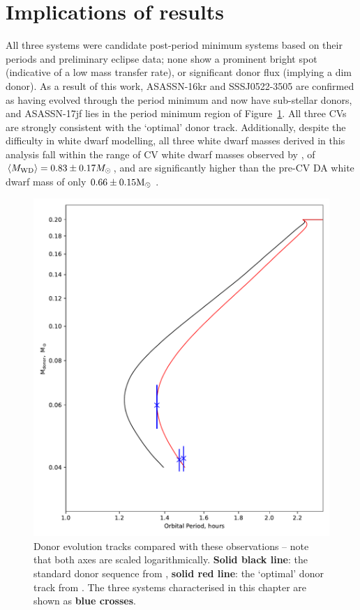 \section{Implications of results}
\label{sect:discussion:three CVs with peculiar white dwarf colours}

All three systems were candidate post-period minimum systems based on their periods and preliminary eclipse data; none show a prominent bright spot (indicative of a low mass transfer rate), or significant donor flux (implying a dim donor).
As a result of this work, ASASSN-16kr and SSSJ0522-3505 are confirmed as having evolved through the period minimum and now have sub-stellar donors, and ASASSN-17jf lies in the period minimum region of Figure~\ref{fig:M2_vs_P}. All three CVs are strongly consistent with the `optimal' \citet{knigge11} donor track.
Additionally, despite the difficulty in white dwarf modelling, all three white dwarf masses derived in this analysis fall within the range of CV white dwarf masses observed by \citet{pala2020}, of $\langle M_{\rm WD}\rangle = 0.83 \pm 0.17 M_\odot$, and are significantly higher than the pre-CV DA white dwarf mass of only $0.66 \pm 0.15 {\rm M_\odot}$ \citep{mccleery2020}.
\begin{figure}
    \centering
    \includegraphics[width=\textwidth]{figures/results/three_cvs_with_weird_colours/GeneralFigs/M2_vs_P_withhumpers.pdf}
    \caption{Donor evolution tracks compared with these observations -- note that both axes are scaled logarithmically. {\bf Solid black line}: the standard donor sequence from \citet{knigge11}, {\bf solid red line}: the `optimal' donor track from \citet{knigge11}. The three systems characterised in this chapter are shown as {\bf blue crosses}.}
    \label{fig:M2_vs_P}
\end{figure}

